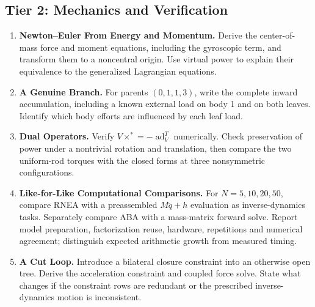 \subsection{Tier 2: Mechanics and Verification}
\begin{enumerate}[itemsep=3pt,topsep=4pt]
\item \textbf{Newton--Euler From Energy and Momentum.} Derive the center-of-mass force and moment equations, including the gyroscopic term, and transform them to a noncentral origin. Use virtual power to explain their equivalence to the generalized Lagrangian equations.
\item \textbf{A Genuine Branch.} For parents $(0,1,1,3)$, write the complete inward accumulation, including a known external load on body 1 and on both leaves. Identify which body efforts are influenced by each leaf load.
\item \textbf{Dual Operators.} Verify $V\times^*=-\operatorname{ad}_V^T$ numerically. Check preservation of power under a nontrivial rotation and translation, then compare the two uniform-rod torques with the closed forms at three nonsymmetric configurations.
\item \textbf{Like-for-Like Computational Comparisons.} For $N=5,10,20,50$, compare RNEA with a preassembled $M\ddot q+h$ evaluation as inverse-dynamics tasks. Separately compare ABA with a mass-matrix forward solve. Report model preparation, factorization reuse, hardware, repetitions and numerical agreement; distinguish expected arithmetic growth from measured timing.
\item \textbf{A Cut Loop.} Introduce a bilateral closure constraint into an otherwise open tree. Derive the acceleration constraint and coupled force solve. State what changes if the constraint rows are redundant or the prescribed inverse-dynamics motion is inconsistent.
\end{enumerate}

